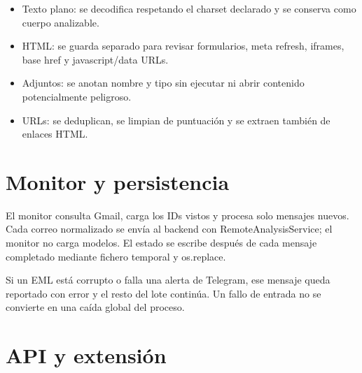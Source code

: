 \documentclass[11pt,a4paper]{article}
\begin{document}
\begin{itemize}
  \item Texto plano: se decodifica respetando el charset declarado y se conserva como cuerpo analizable.
  \item HTML: se guarda separado para revisar formularios, meta refresh, iframes, base href y javascript/\allowbreak{}data URLs.
  \item Adjuntos: se anotan nombre y tipo sin ejecutar ni abrir contenido potencialmente peligroso.
  \item URLs: se deduplican, se limpian de puntuación y se extraen también de enlaces HTML.
\end{itemize}

\section{Monitor y persistencia}

El monitor consulta Gmail, carga los IDs vistos y procesa solo mensajes nuevos. Cada correo normalizado se envía al backend con RemoteAnalysisService; el monitor no carga modelos. El estado se escribe después de cada mensaje completado mediante fichero temporal y os.replace.

Si un EML está corrupto o falla una alerta de Telegram, ese mensaje queda reportado con error y el resto del lote continúa. Un fallo de entrada no se convierte en una caída global del proceso.

\section{API y extensión}
\end{document}
